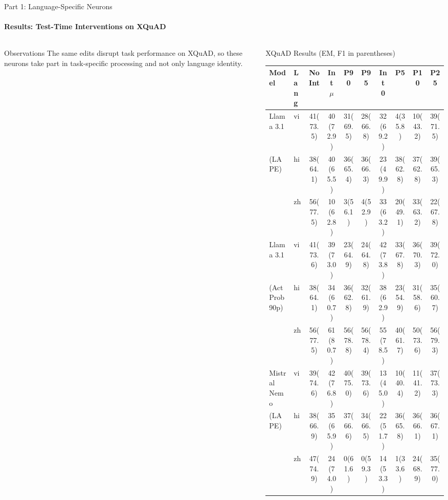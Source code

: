 \documentclass[aspectratio=169]{beamer}
\begin{document}
	\begin{frame}{Part 1: Language-Specific Neurons}
		\framesubtitle{Results: Test-Time Interventions on XQuAD}
		\begin{columns}
			\begin{column}{0.15\textwidth}
				\begin{block}{\scriptsize Observations}\scriptsize
					The same edits disrupt task performance on XQuAD, so these neurons take part in task-specific processing and not only language identity.
				\end{block}
			\end{column}
			\begin{column}{0.75\textwidth}
				\begin{block}{\scriptsize XQuAD Results (EM, F1 in parentheses)}\tiny
					\centering
					\setlength{\tabcolsep}{2.5pt}
					\begin{tabular}{l l c c c c c c c c}
						\toprule
						Model & Lang & No Int & Int $\mu$ & P90 & P95 & Int 0 & P5 & P10 & P25 \\
						\midrule
						Llama 3.1 & vi & 41(73.5) & 40(72.9) & 31(69.5) & 28(66.8) & 32(69.2) & 4(35.8) & 10(43.2) & 39(71.5) \\
						(LAPE) & hi & 38(64.1) & 40(65.5) & 36(65.4) & 36(66.3) & 23(49.9) & 38(62.8) & 37(62.8) & 39(65.3) \\
						& zh & 56(77.5) & 10(62.8) & 3(56.1) & 4(52.9) & 33(63.2) & 20(49.1) & 33(63.2) & 22(67.8) \\
						\midrule
						Llama 3.1 & vi & 41(73.6) & 39(73.0) & 23(64.9) & 24(64.8) & 42(73.8) & 33(67.8) & 36(70.3) & 39(72.0) \\
						(Act Prob 90p) & hi & 38(64.1) & 34(60.7) & 36(62.8) & 32(61.9) & 38(62.9) & 23(54.9) & 31(58.6) & 35(60.7) \\
						& zh & 56(77.5) & 61(80.7) & 56(78.8) & 56(78.4) & 55(78.5) & 40(61.7) & 50(73.6) & 56(79.3) \\
						\midrule
						Mistral Nemo & vi & 39(74.6) & 42(76.8) & 40(75.0) & 39(73.6) & 13(45.0) & 10(40.4) & 11(41.2) & 37(73.3) \\
						(LAPE) & hi & 38(66.9) & 35(65.9) & 37(66.6) & 34(66.5) & 22(51.7) & 36(65.8) & 36(66.1) & 36(67.1) \\
						& zh & 47(74.9) & 24(74.0) & 0(61.6) & 0(59.3) & 14(53.3) & 1(33.6) & 24(68.9) & 35(77.0) \\

\end{tabular}
\end{block}
\end{column}
\end{columns}
\end{frame}
\end{document}
